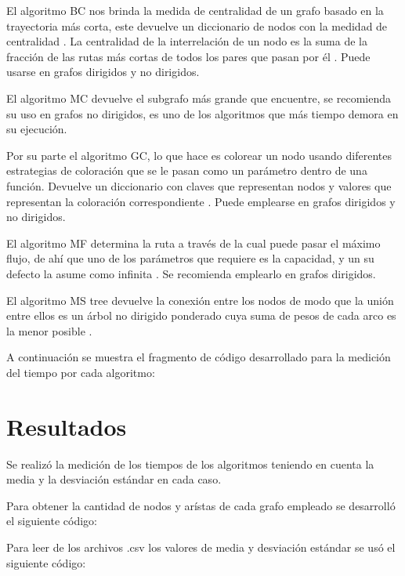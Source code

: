 \documentclass{article}
\begin{document}
El algoritmo BC nos brinda la medida de centralidad de un grafo basado en la trayectoria más corta, este devuelve un diccionario de nodos con la medidad de centralidad \cite{bc}.
La centralidad de la interrelación de un nodo es la suma de la fracción de las rutas más cortas de todos los pares que pasan por él \cite{bccentralidad}. Puede usarse en grafos dirigidos y no dirigidos.

El algoritmo MC devuelve el subgrafo más grande que encuentre, se recomienda su uso en grafos no dirigidos, es uno de los algoritmos que más tiempo demora en su ejecución.  

Por su parte el algoritmo GC, lo que hace es colorear un nodo usando diferentes estrategias de coloración que se le pasan como un parámetro dentro de una función.  Devuelve un diccionario con claves que representan nodos y valores que representan la coloración correspondiente \cite{gredy}. Puede emplearse en grafos dirigidos y no dirigidos.

El algoritmo MF determina la ruta a través de la cual puede pasar el máximo flujo, de ahí que uno de los parámetros que requiere es la capacidad, y un su defecto la asume como infinita \cite{mf}. Se recomienda emplearlo en grafos dirigidos.

El algoritmo MS tree devuelve la conexión entre los nodos de modo que la unión entre ellos es un árbol no dirigido ponderado cuya suma de pesos de cada arco es la menor posible \cite{min}.

A continuación se muestra el fragmento de código desarrollado para la medición del tiempo por cada algoritmo:


%
\newpage
\section{Resultados} 

Se realizó la medición de los tiempos de los algoritmos teniendo en cuenta la media y la desviación estándar en cada caso. 

Para obtener la cantidad de nodos y arístas de cada grafo empleado se desarrolló el siguiente código:




Para leer de los archivos .csv los valores de media y desviación estándar se usó el siguiente código:
\end{document}
